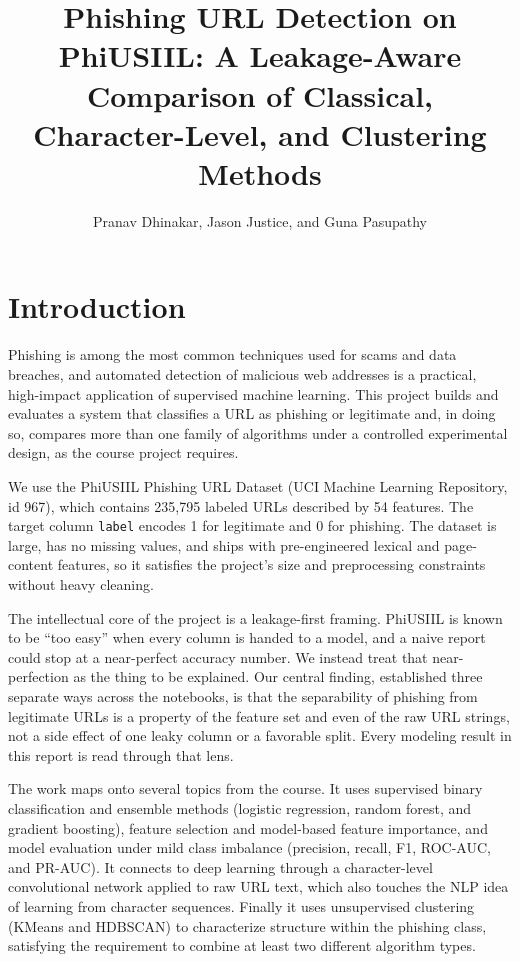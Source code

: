 \documentclass[stu,12pt,floatsintext]{apa7}
\title{Phishing URL Detection on PhiUSIIL: A Leakage-Aware Comparison of
Classical, Character-Level, and Clustering Methods}
\author{Pranav Dhinakar, Jason Justice, and Guna Pasupathy}
\affiliation{Shiley-Marcos School of Engineering, University of San Diego}
\newcommand{\code}[1]{\texttt{#1}}
\begin{document}
\maketitle

\section{Introduction}

Phishing is among the most common techniques used for scams and data
breaches, and automated detection of malicious web addresses is a
practical, high-impact application of supervised machine learning. This
project builds and evaluates a system that classifies a URL as phishing or
legitimate and, in doing so, compares more than one family of algorithms
under a controlled experimental design, as the course project requires.

We use the PhiUSIIL Phishing URL Dataset (UCI Machine Learning Repository,
id 967), which contains 235{,}795 labeled URLs described by 54 features.
The target column \code{label} encodes 1 for legitimate and 0 for
phishing. The dataset is large, has no missing values, and ships with
pre-engineered lexical and page-content features, so it satisfies the
project's size and preprocessing constraints without heavy cleaning.

The intellectual core of the project is a leakage-first framing. PhiUSIIL
is known to be ``too easy'' when every column is handed to a model, and a
naive report could stop at a near-perfect accuracy number. We instead
treat that near-perfection as the thing to be explained. Our central
finding, established three separate ways across the notebooks, is that the
separability of phishing from legitimate URLs is a property of the feature
set and even of the raw URL strings, not a side effect of one leaky
column or a favorable split. Every modeling result in this report is read
through that lens.

The work maps onto several topics from the course. It uses supervised
binary classification and ensemble methods (logistic regression, random
forest, and gradient boosting), feature selection and model-based feature
importance, and model evaluation under mild class imbalance (precision,
recall, F1, ROC-AUC, and PR-AUC). It connects to deep learning through a
character-level convolutional network applied to raw URL text, which also
touches the NLP idea of learning from character sequences. Finally it uses
unsupervised clustering (KMeans and HDBSCAN) to characterize structure
within the phishing class, satisfying the requirement to combine at least
two different algorithm types.
\end{document}
